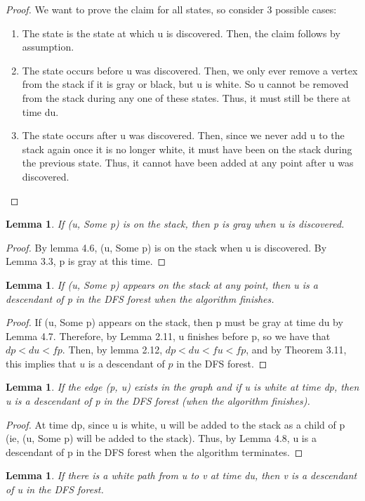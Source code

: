 \documentclass{article}
\newtheorem{lemma}[theorem]{Lemma}
\begin{document}
\begin{proof}
We want to prove the claim for all states, so consider 3 possible cases:
\begin{enumerate}
\item
The state is the state at which u is discovered. Then, the claim follows by assumption.
\item
The state occurs before u was discovered. Then, we only ever remove a vertex from the stack if it is gray or black, but u is white. So u cannot be removed from the stack during any one of these states. Thus, it must still be there at time du.
\item
The state occurs after u was discovered. Then, since we never add u to the stack again once it is no longer white, it must have been on the stack during the previous state. Thus, it cannot have been added at any point after u was discovered.
\end{enumerate}
\end{proof}
\begin{lemma}
If (u, Some p) is on the stack, then p is gray when u is discovered.
\end{lemma}
\begin{proof}
By lemma 4.6, (u, Some p) is on the stack when u is discovered. By Lemma 3.3, p is gray at this time.
\end{proof}
\begin{lemma}
If (u, Some p) appears on the stack at any point, then u is a descendant of p in the DFS forest when the algorithm finishes.
\end{lemma}
\begin{proof}
If (u, Some p) appears on the stack, then p must be gray at time du by Lemma 4.7. Therefore, by Lemma 2.11, u finishes before p, so we have that $dp < du < fp$. Then, by lemma 2.12, $dp < du < fu < fp$, and by Theorem 3.11, this implies that $u$ is a descendant of $p$ in the DFS forest.
\end{proof}
\begin{lemma}
If the edge (p, u) exists in the graph and if u is white at time dp, then u is a descendant of p in the DFS forest (when the algorithm finishes).
\end{lemma}
\begin{proof}
At time dp, since u is white, u will be added to the stack as a child of p (ie, (u, Some p) will be added to the stack). Thus, by Lemma 4.8, u is a descendant of p in the DFS forest when the algorithm terminates.
\end{proof}
\begin{lemma}
If there is a white path from u to v at time du, then v is a descendant of u in the DFS forest.
\end{lemma}
\end{document}
